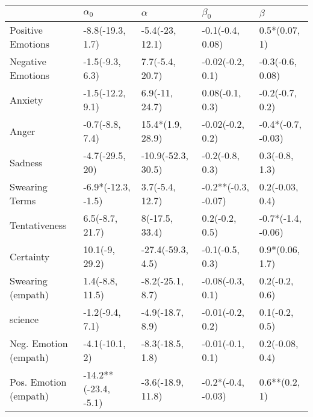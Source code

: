 \begin{tabular}{lllll}
\toprule
{} &            $\alpha_0$ &            $\alpha$ &            $\beta_0$ &             $\beta$ \\
\midrule
Positive Emotions     &      -8.8(-19.3, 1.7) &     -5.4(-23, 12.1) &     -0.1(-0.4, 0.08) &       0.5*(0.07, 1) \\
Negative Emotions     &       -1.5(-9.3, 6.3) &     7.7(-5.4, 20.7) &     -0.02(-0.2, 0.1) &    -0.3(-0.6, 0.08) \\
Anxiety               &      -1.5(-12.2, 9.1) &      6.9(-11, 24.7) &      0.08(-0.1, 0.3) &     -0.2(-0.7, 0.2) \\
Anger                 &       -0.7(-8.8, 7.4) &    15.4*(1.9, 28.9) &     -0.02(-0.2, 0.2) &  -0.4*(-0.7, -0.03) \\
Sadness               &       -4.7(-29.5, 20) &  -10.9(-52.3, 30.5) &      -0.2(-0.8, 0.3) &      0.3(-0.8, 1.3) \\
Swearing Terms        &    -6.9*(-12.3, -1.5) &     3.7(-5.4, 12.7) &  -0.2**(-0.3, -0.07) &     0.2(-0.03, 0.4) \\
Tentativeness         &       6.5(-8.7, 21.7) &      8(-17.5, 33.4) &       0.2(-0.2, 0.5) &  -0.7*(-1.4, -0.06) \\
Certainty             &        10.1(-9, 29.2) &   -27.4(-59.3, 4.5) &      -0.1(-0.5, 0.3) &     0.9*(0.06, 1.7) \\
Swearing (empath)     &       1.4(-8.8, 11.5) &    -8.2(-25.1, 8.7) &     -0.08(-0.3, 0.1) &      0.2(-0.2, 0.6) \\
science               &       -1.2(-9.4, 7.1) &    -4.9(-18.7, 8.9) &     -0.01(-0.2, 0.2) &      0.1(-0.2, 0.5) \\
Neg. Emotion (empath) &        -4.1(-10.1, 2) &    -8.3(-18.5, 1.8) &     -0.01(-0.1, 0.1) &     0.2(-0.08, 0.4) \\
Pos. Emotion (empath) &  -14.2**(-23.4, -5.1) &   -3.6(-18.9, 11.8) &   -0.2*(-0.4, -0.03) &       0.6**(0.2, 1) \\
\bottomrule
\end{tabular}
